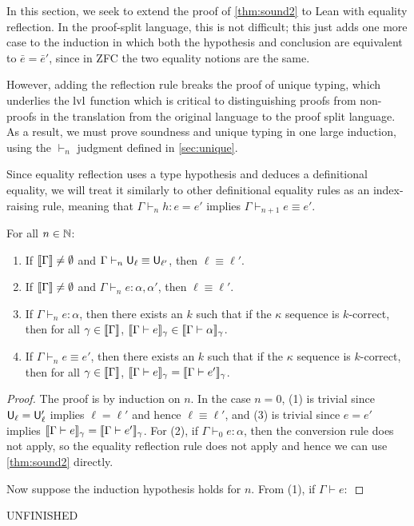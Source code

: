 In this section, we seek to extend the proof of \autoref{thm:sound2} to Lean with equality reflection. In the proof-split language, this is not difficult; this just adds one more case to the induction in which both the hypothesis and conclusion are equivalent to $\bar e=\bar e'$, since in ZFC the two equality notions are the same.

However, adding the reflection rule breaks the proof of unique typing, which underlies the $\operatorname{lvl}$ function which is critical to distinguishing proofs from non-proofs in the translation from the original language to the proof split language. As a result, we must prove soundness and unique typing in one large induction, using the $\vdash_n$ judgment defined in \autoref{sec:unique}.

Since equality reflection uses a type hypothesis and deduces a definitional equality, we will treat it similarly to other definitional equality rules as an index-raising rule, meaning that $\Gamma\vdash_n h:e=e'$ implies $\Gamma\vdash_{n+1} e\equiv e'$.

\begin{theorem}
For all $n\in\mathbb{N}$:
\begin{enumerate}
\item If $\scott{\Gamma}\ne\emptyset$ and $\Gamma\vdash_n\U_\ell\equiv\U_{\ell'}$, then $\ell\equiv\ell'$.
\item If $\scott{\Gamma}\ne\emptyset$ and $\Gamma\vdash_n e:\alpha,\alpha'$, then $\ell\equiv\ell'$.
\item If $\Gamma\vdash_n e:\alpha$, then there exists an $k$ such that if the $\kappa$ sequence is $k$-correct, then for all $\gamma\in\scott{\Gamma}$, $\scott{\Gamma\vdash e}_\gamma\in \scott{\Gamma\vdash \alpha}_\gamma$.
\item If $\Gamma\vdash_n e\equiv e'$, then there exists an $k$ such that if the $\kappa$ sequence is $k$-correct, then for all $\gamma\in\scott{\Gamma}$, $\scott{\Gamma\vdash e}_\gamma=\scott{\Gamma\vdash e'}_\gamma$.
\end{enumerate}
\end{theorem}
\begin{proof}
The proof is by induction on $n$. In the case $n=0$, (1) is trivial since $\mathsf{U}_\ell=\mathsf{U}_\ell'$ implies $\ell=\ell'$ and hence $\ell\equiv\ell'$, and (3) is trivial since $e=e'$ implies $\scott{\Gamma\vdash e}_{\gamma}=\scott{\Gamma\vdash e'}_{\gamma}$. For (2), if $\Gamma\vdash_0 e:\alpha$, then the conversion rule does not apply, so the equality reflection rule does not apply and hence we can use \autoref{thm:sound2} directly.

Now suppose the induction hypothesis holds for $n$. From (1), if $\Gamma\vdash e:$
\end{proof}

UNFINISHED

